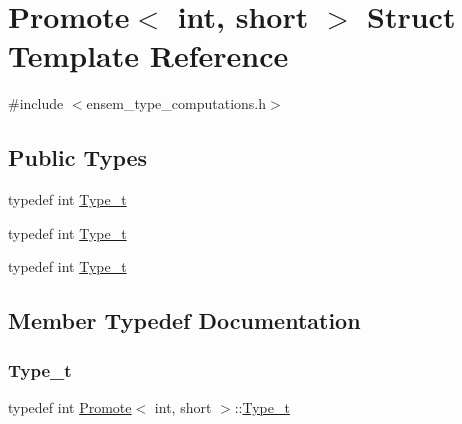 \hypertarget{structPromote_3_01int_00_01short_01_4}{}\section{Promote$<$ int, short $>$ Struct Template Reference}
\label{structPromote_3_01int_00_01short_01_4}


{\ttfamily \#include $<$ensem\+\_\+type\+\_\+computations.\+h$>$}

\subsection*{Public Types}
\begin{DoxyCompactItemize}
\item 
typedef int \mbox{\hyperlink{structPromote_3_01int_00_01short_01_4_aeccdff5aed8403672c3c04fc17570d5e}{Type\+\_\+t}}
\item 
typedef int \mbox{\hyperlink{structPromote_3_01int_00_01short_01_4_aeccdff5aed8403672c3c04fc17570d5e}{Type\+\_\+t}}
\item 
typedef int \mbox{\hyperlink{structPromote_3_01int_00_01short_01_4_aeccdff5aed8403672c3c04fc17570d5e}{Type\+\_\+t}}
\end{DoxyCompactItemize}


\subsection{Member Typedef Documentation}
\mbox{\label{structPromote_3_01int_00_01short_01_4_aeccdff5aed8403672c3c04fc17570d5e}} 
\subsubsection{\texorpdfstring{Type\_t}{Type\_t}\hspace{0.1cm}{\footnotesize\ttfamily [1/3]}}
{\footnotesize\ttfamily typedef int \mbox{\hyperlink{structPromote}{Promote}}$<$ int, short $>$\+::\mbox{\hyperlink{structPromote_3_01int_00_01short_01_4_aeccdff5aed8403672c3c04fc17570d5e}{Type\+\_\+t}}}

\mbox{\label{structPromote_3_01int_00_01short_01_4_aeccdff5aed8403672c3c04fc17570d5e}} 
